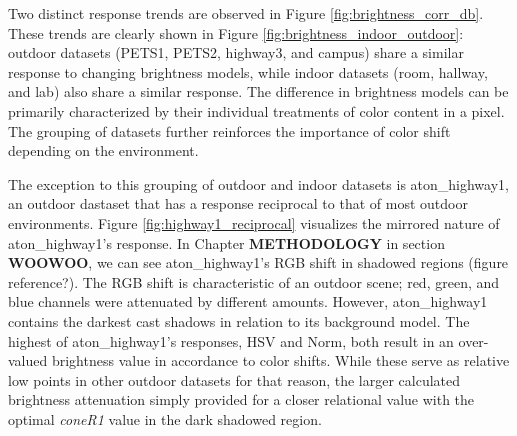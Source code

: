 \documentclass[12pt]{report}
\begin{document}
Two distinct response trends are observed in Figure \ref{fig:brightness_corr_db}. These trends are clearly shown in Figure \ref{fig:brightness_indoor_outdoor}: outdoor datasets (PETS1, PETS2, highway3, and campus) share a similar response to changing brightness models, while indoor datasets (room, hallway, and lab) also share a similar response. The difference in brightness models can be primarily characterized by their individual treatments of color content in a pixel. The grouping of datasets further reinforces the importance of color shift depending on the environment.

The exception to this grouping of outdoor and indoor datasets is aton\_highway1, an outdoor dastaset that has a response reciprocal to that of most outdoor environments. Figure \ref{fig:highway1_reciprocal} visualizes the mirrored nature of aton\_highway1's response. In Chapter \textbf{METHODOLOGY} in section \textbf{WOOWOO}, we can see aton\_highway1's RGB shift in shadowed regions (figure reference?). The RGB shift is characteristic of an outdoor scene; red, green, and blue channels were attenuated by different amounts. However, aton\_highway1 contains the darkest cast shadows in relation to its background model. The highest of aton\_highway1's responses, HSV and Norm, both result in an over-valued brightness value in accordance to color shifts. While these serve as relative low points in other outdoor datasets for that reason, the larger calculated brightness attenuation simply provided for a closer relational value with the optimal \textit{coneR1} value in the dark shadowed region.
\end{document}
